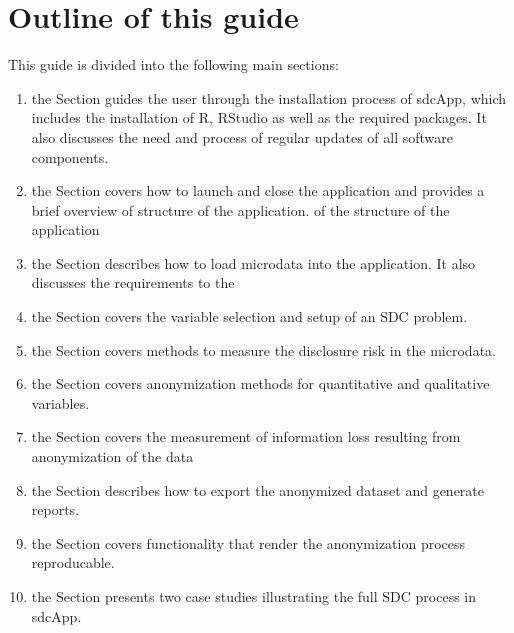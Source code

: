 \documentclass[letterpaper,10pt,english]{sphinxmanual}
\begin{document}
\section{Outline of this guide}
\label{\detokenize{introduction:outline-of-this-guide}}
This guide is divided into the following main sections:
\begin{enumerate}
\item {} 
the Section  guides the user through the installation process of sdcApp, which includes the installation of R, RStudio as well as the required packages. It also discusses the need and process of regular updates of all software components.

\item {} 
the Section  covers how to launch and close the application and provides a brief overview of structure of the application.  of the structure of the application

\item {} 
the Section  describes how to load microdata into the application. It also discusses the requirements to the

\item {} 
the Section   covers the variable selection and setup of an SDC problem.

\item {} 
the Section  covers methods to measure the disclosure risk in the microdata.

\item {} 
the Section  covers anonymization methods for quantitative and qualitative variables.

\item {} 
the Section  covers the measurement of information loss resulting from anonymization of the data

\item {} 
the Section  describes how to export the anonymized dataset and generate reports.

\item {} 
the Section  covers functionality that render the anonymization process reproducable.

\item {} 
the Section  presents two case studies illustrating the full SDC process in sdcApp.

\end{enumerate}
\end{document}

